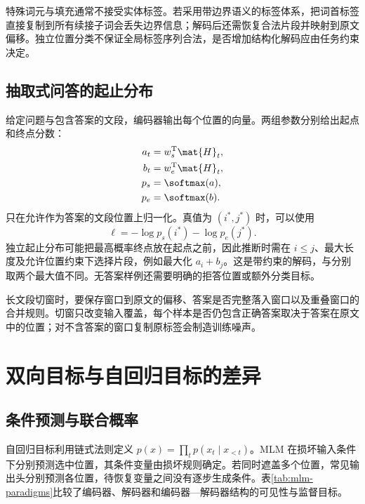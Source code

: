 \documentclass[../textbook.tex]{subfiles}
\begin{document}
特殊词元与填充通常不接受实体标签。若采用带边界语义的标签体系，把词首标签直接复制到所有续接子词会丢失边界信息；解码后还需恢复合法片段并映射到原文偏移。独立位置分类不保证全局标签序列合法，是否增加结构化解码应由任务约束决定。

\subsection{抽取式问答的起止分布}
给定问题与包含答案的文段，编码器输出每个位置的向量。两组参数分别给出起点和终点分数：
\begin{equation}
 \begin{aligned}
  a_t&=w_s^{\mathrm{T}}\mat{H}_t,\\
  b_t&=w_e^{\mathrm{T}}\mat{H}_t,\\
  p_s&=\softmax(a),\\
  p_e&=\softmax(b).
 \end{aligned}
\end{equation}
只在允许作为答案的文段位置上归一化。真值为 $(i^*,j^*)$ 时，可以使用
\begin{equation}
 \ell=-\log p_s(i^*)-\log p_e(j^*).
\end{equation}
独立起止分布可能把最高概率终点放在起点之前，因此推断时需在 $i\le j$、最大长度及允许位置约束下选择片段，例如最大化 $a_i+b_j$。这是带约束的解码，与分别取两个最大值不同。无答案样例还需要明确的拒答位置或额外分类目标。

长文段切窗时，要保存窗口到原文的偏移、答案是否完整落入窗口以及重叠窗口的合并规则。切窗只改变输入覆盖，每个样本是否仍包含正确答案取决于答案在原文中的位置；对不含答案的窗口复制原标签会制造训练噪声。

\section{双向目标与自回归目标的差异}

\subsection{条件预测与联合概率}
自回归目标利用链式法则定义 $p(x)=\prod_t p(x_t\mid x_{<t})$。MLM 在损坏输入条件下分别预测选中位置，其条件变量由损坏规则确定。若同时遮盖多个位置，常见输出头分别预测各位置，待恢复变量之间没有逐步生成条件。表\ref{tab:mlm-paradigms}比较了编码器、解码器和编码器—解码器结构的可见性与监督目标。
\end{document}
